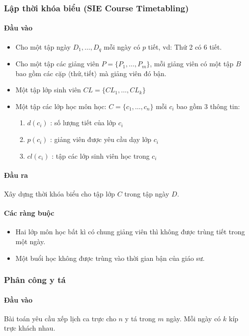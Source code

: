 \documentclass[a4paper,12pt]{report}
\begin{document}
\subsubsection{Lập thời khóa biểu (SIE Course Timetabling)}



\paragraph{Đầu vào}
\begin{itemize}
\item Cho một tập ngày $D_1,\ldots, D_q$ mỗi ngày có $p$ tiết, vd: Thứ 2 có 6 tiết.
\item Cho một tập các giảng viên $P=\{P_1,\ldots,P_m\}$, mỗi giảng viên có một tập $B$ bao gồm các cặp $\langle \text{thứ},\text{tiết}\rangle$ mà giảng viên đó bận.
\item Một tập lớp sinh viên $CL=\{CL_1,\ldots,CL_k\}$
\item Một tập các lớp học môn học: $C=\{c_1,\ldots, c_n\}$ mỗi $c_i$ bao gồm 3 thông tin: 
	\begin{enumerate}
	\item $d(c_i)$ : số lượng tiết của lớp $c_i$
	\item $p(c_i)$ : giảng viên được yêu cầu dạy lớp $c_i$
	\item $cl(c_i)$ : tập các lớp sinh viên học trong $c_i$
	\end{enumerate}
\end{itemize} 
\paragraph{Đầu ra}
Xây dựng thời khóa biểu cho tập lớp $C$ trong tập ngày $D$.
\paragraph{Các ràng buộc}
\begin{itemize}
\item Hai lớp môn học bất kì có chung giảng viên thì không được trùng tiết trong một ngày.
\item Một buổi học không được trùng vào thời gian bận của giáo sư\cite{CBLS}.
\end{itemize}
\subsubsection{Phân công y tá}
\paragraph{Đầu vào}
Bài toán yêu cầu xếp lịch ca trực cho $n$ y tá trong $m$ ngày. Mỗi ngày có $k$ kíp trực khách nhau.  
\end{document}
